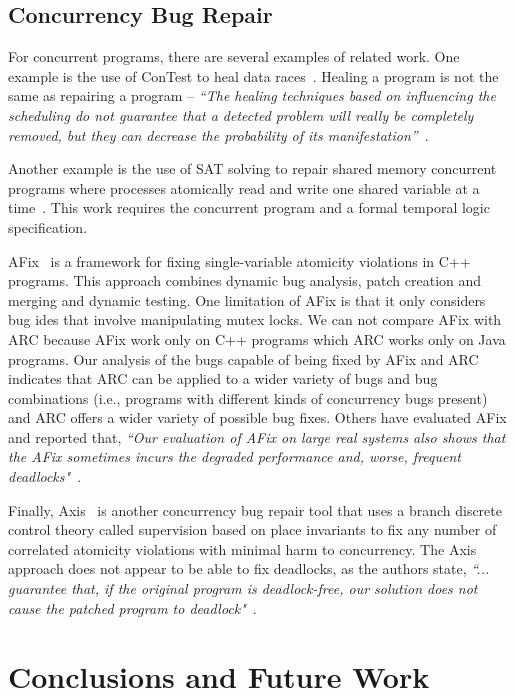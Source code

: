 \documentclass[runningheads,a4paper]{llncs}
\begin{document}
\subsection{Concurrency Bug Repair}

For concurrent programs, there are several examples of related work. One example is the use of ConTest to heal data races~\cite{KLT+07, LVK08}. Healing a program is not the same as repairing a program -- \textit{``The healing techniques based on influencing the scheduling do not guarantee that a detected problem will really be completely removed, but they can decrease the probability of its manifestation''}~\cite{LVK08}. 

Another example is the use of SAT solving to repair shared memory concurrent programs where processes atomically read and write one shared variable at a time~\cite{AY07}. This work requires the concurrent program and a formal temporal logic specification. 

AFix~\cite{JSZL+11} is a framework for fixing single-variable atomicity violations in C++ programs. This approach combines dynamic bug analysis, patch creation and merging and dynamic testing. One limitation of AFix is that it only considers bug ides that involve manipulating mutex locks. We can not compare AFix with ARC because AFix work only on C++ programs which ARC works only on Java programs. Our analysis of the bugs capable of being fixed by AFix and ARC indicates that ARC can be applied to a wider variety of bugs and bug combinations (i.e., programs with different kinds of concurrency bugs present) and ARC offers a wider variety of possible bug fixes. Others have evaluated AFix and reported that, \textit{``Our evaluation of AFix on large real systems also shows that the AFix sometimes incurs the degraded performance and, worse, frequent deadlocks"}~\cite{LZ12}. 

Finally, Axis~\cite{LZ12} is another concurrency bug repair tool that uses a branch discrete control theory called supervision based on place invariants to fix any number of correlated atomicity violations with minimal harm to concurrency. The Axis approach does not appear to be able to fix deadlocks, as the authors state, \textit{``... guarantee that, if the original program is deadlock-free, our solution does not cause the patched program to deadlock"}~\cite{LZ12}.

\section{Conclusions and Future Work}
\label{sec:conclusion}
\end{document}
